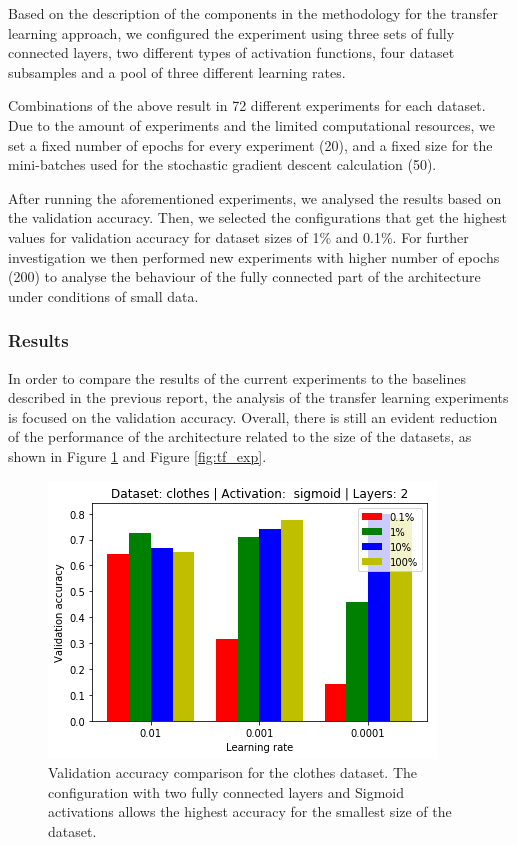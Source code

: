\documentclass{article}
\begin{document}
Based on the description of the components in the methodology for the transfer learning approach, we configured the experiment using three sets of fully connected layers, two different types of activation functions, four dataset subsamples and a pool of three different learning rates.

Combinations of the above result in 72 different experiments for each dataset. Due to the amount of experiments and the limited computational resources, we set a fixed number of epochs for every experiment (20), and a fixed size for the mini-batches used for the stochastic gradient descent calculation (50).

After running the aforementioned experiments, we analysed the results based on the validation accuracy. Then, we selected the configurations that get the highest values for validation accuracy for dataset sizes of 1\% and 0.1\%. For further investigation we then performed new experiments with higher number of epochs (200) to analyse the behaviour of the fully connected part of the architecture under conditions of small data.

\subsubsection{\textbf{Results}}

In order to compare the results of the current experiments to the baselines described in the previous report, the analysis of the transfer learning experiments is focused on the validation accuracy. Overall, there is still an evident reduction of the performance of the architecture related to the size of the datasets, as shown in Figure \ref{fig:tf_clot} and Figure \ref{fig:tf_exp}.

\begin{figure}
    \vskip 5mm
        \begin{center}
            \includegraphics[scale=0.5]{accuracy_reduction_00.png}
            \caption{Validation accuracy comparison for the clothes dataset. The configuration with two fully connected layers and Sigmoid activations allows the highest accuracy for the smallest size of the dataset.}
            \label{fig:tf_clot}
        \end{center}
    \vskip -5mm
\end{figure}
\end{document}

